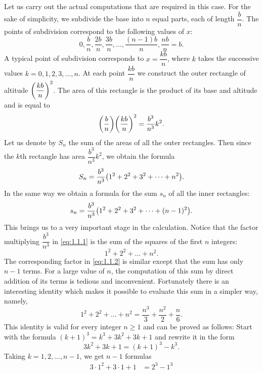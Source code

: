 \begin{note}
  Let us carry out the actual computations that are required in this case.
  For the sake of simplicity, we subdivide the base into \(n\) equal parts, each of length \(\dfrac{b}{n}\).
  The points of subdivision correspond to the following values of \(x\):
  \[
    0, \dfrac{b}{n}, \dfrac{2b}{n}, \dfrac{3b}{n}, \dots, \dfrac{(n - 1) b}{n}, \dfrac{nb}{n} = b.
  \]
  A typical point of subdivision corresponds to \(x = \dfrac{kb}{n}\), where \(k\) takes the successive values \(k = 0, 1, 2, 3, \dots, n\).
  At each point \(\dfrac{kb}{n}\) we construct the outer rectangle of altitude \(\left\lparen\dfrac{kb}{n}\right\rparen^2\).
  The area of this rectangle is the product of its base and altitude and is equal to
  \[
    \pa{\dfrac{b}{n}} \pa{\dfrac{kb}{n}}^2 = \dfrac{b^3}{n^3} k^2.
  \]
  Let us denote by \(S_n\) the sum of the areas of all the outer rectangles.
  Then since the \(k\)th rectangle has area \(\dfrac{b^3}{n^3} k^2\), we obtain the formula
  \begin{equation}\label{eq:1.1.1}
    S_n = \dfrac{b^3}{n^3} \pa{1^2 + 2^2 + 3^2 + \dots + n^2}.
  \end{equation}
  In the same way we obtain a formula for the sum \(s_n\) of all the inner rectangles:
  \begin{equation}\label{eq:1.1.2}
    s_n = \dfrac{b^3}{n^3} \pa{1^2 + 2^2 + 3^2 + \dots + (n - 1)^2}.
  \end{equation}
  This brings us to a very important stage in the calculation.
  Notice that the factor multiplying \(\dfrac{b^3}{n^3}\) in \cref{eq:1.1.1} is the sum of the squares of the first \(n\) integers:
  \[
    1^2 + 2^2 + \dots + n^2.
  \]
  The corresponding factor in \cref{eq:1.1.2} is similar except that the sum has only \(n - 1\) terms.
  For a large value of \(n\), the computation of this sum by direct addition of its terms is tedious and inconvenient.
  Fortunately there is an interesting identity which makes it possible to evaluate this sum in a simpler way, namely,
  \begin{equation}\label{eq:1.1.3}
    1^2 + 2^2 + \dots + n^2 = \dfrac{n^3}{3} + \dfrac{n^2}{2} + \dfrac{n}{6}.
  \end{equation}
  This identity is valid for every integer \(n \geq 1\) and can be proved as follows:
  Start with the formula \((k + 1)^3 = k^3 + 3 k^2 + 3k + 1\) and rewrite it in the form
  \[
    3 k^2 + 3k + 1 = (k + 1)^3 - k^3.
  \]
  Taking \(k = 1, 2, \dots, n - 1\), we get \(n - 1\) formulas
  \begin{align*}
    3 \cdot 1^2 + 3 \cdot 1 + 1             & = 2^3 - 1^3        \\

\end{align*}
\end{note}
